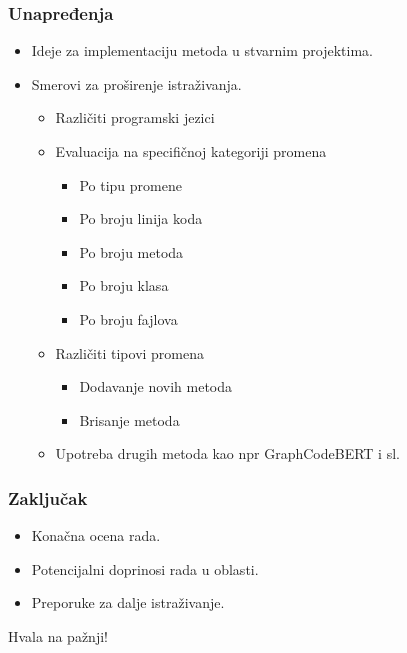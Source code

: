 \documentclass{beamer}
\begin{document}
\begin{frame}
\frametitle{Unapređenja}
\begin{itemize}
    \item Ideje za implementaciju metoda u stvarnim projektima.
    \item Smerovi za proširenje istraživanja.
    \begin{itemize}
        \item Različiti programski jezici
        \item Evaluacija na specifičnoj kategoriji promena
        \begin{itemize}
            \item Po tipu promene
            \item Po broju linija koda
            \item Po broju metoda
            \item Po broju klasa
            \item Po broju fajlova
        \end{itemize}
        \item Različiti tipovi promena
        \begin{itemize}
            \item Dodavanje novih metoda
            \item Brisanje metoda
        \end{itemize}
        \item Upotreba drugih metoda kao npr GraphCodeBERT i sl.
    \end{itemize}
\end{itemize}
\end{frame}

\begin{frame}
\frametitle{Zaključak}
\begin{itemize}
    \item Konačna ocena rada.
    \item Potencijalni doprinosi rada u oblasti.
    \item Preporuke za dalje istraživanje.
\end{itemize}
\end{frame}

\begin{frame}
    \begin{center}
        \Huge{Hvala na pažnji!}
    \end{center}
    

\end{frame}
\end{document}
